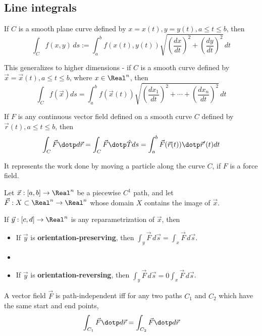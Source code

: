 \subsection{Line integrals}

\begin{definition}
  If $C$ is a smooth plane curve defined by $x = x(t), y = y(t), a \leq t \leq b$, then
  \[
    \int_C f(x, y) \,ds := \int_a^b f(x(t), y(t)) \sqrt{\left(\frac{dx}{dt}\right)^2 + \left(\frac{dy}{dt}\right)^2} \,dt
  \]

  This generalizes to higher dimensions - if $C$ is a smooth curve defined by $\vec{x} = \vec{x}(t), a \leq t \leq b$, where $x \in \Real^n$, then
  \[
    \int_C f(\vec{x}) ds = \int_a^b f(\vec{x}(t)) \sqrt{\left(\frac{dx_1}{dt}\right)^2 + \cdots + \left(\frac{dx_n}{dt}\right)^2} \,dt
  \]
\end{definition}

\begin{definition}
  If $F$ is any continuous vector field defined on a smooth curve $C$ defined by $\vec{r}(t), a \leq t \leq b$, then
  \[
    \int_C \vec{F} \dotp d\vec{r} = \int_C \vec{F} \dotp \hat{T} ds = \int_a^b \vec{F}(\vec{r}(t)) \dotp \vec{r}'(t) dt
  \]

  It represents the work done by moving a particle along the curve $C$, if $F$ is a force field.
\end{definition}


\begin{definition}
  Let $\vec{x} : [a, b] \to \Real^n$ be a piecewise $C^1$ path, and let $\vec{F} : X \subset \Real^n \to \Real^n$ whose domain $X$ contains the image of $\vec{x}$.

  If $\vec{y} : [c, d] \to \Real^n$ is any reparametrization of $\vec{x}$, then
  \begin{itemize}
    \item If $\vec{y}$ is \textbf{orientation-preserving}, then $\int_y \vec{F} \,d\vec{s} = \int_x \vec{F} \,d\vec{s}$.
    \item \item If $\vec{y}$ is \textbf{orientation-reversing}, then $\int_y \vec{F} \,d\vec{s} = 0\int_x \vec{F} \,d\vec{s}$.
  \end{itemize}
\end{definition}

\begin{definition}
  A vector field $\vec{F}$ is path-independent iff for any two paths $C_1$ and $C_2$ which have the same start and end points,
  \[
    \int_{C_1} \vec{F} \dotp d\vec{r} = \int_{C_2} \vec{F} \dotp d\vec{r}
  \]
\end{definition}

